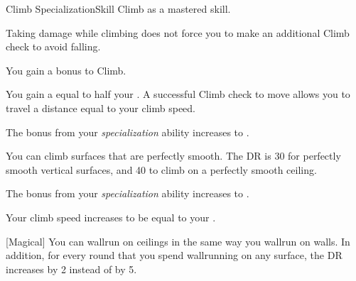     \begin{feat}{Climb Specialization}{Skill}
        \featpre Climb as a mastered skill.

         Taking damage while climbing does not force you to make an additional Climb check to avoid falling.

         You gain a  bonus to Climb.

         You gain a  equal to half your .
        A successful Climb check to move allows you to travel a distance equal to your climb speed.

         The bonus from your \textit{specialization} ability increases to .

         You can climb surfaces that are perfectly smooth.
        The DR is 30 for perfectly smooth vertical surfaces, and 40 to climb on a perfectly smooth ceiling.

         The bonus from your \textit{specialization} ability increases to .

         Your climb speed increases to be equal to your .

        [Magical] You can wallrun on ceilings in the same way you wallrun on walls.
        In addition, for every round that you spend wallrunning on any surface, the DR increases by 2 instead of by 5.
    \end{feat}

